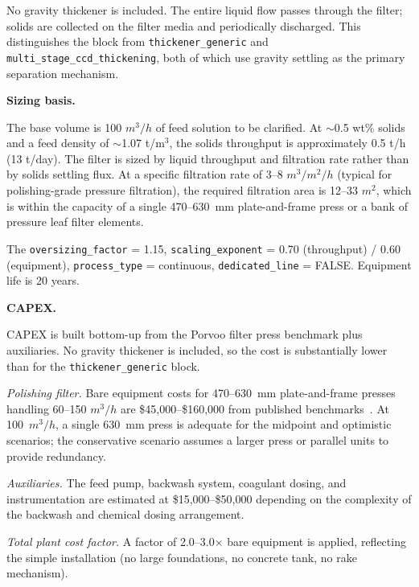 \noindent No gravity thickener is included. The entire liquid flow passes through the filter; solids are collected on the filter media and periodically discharged. This distinguishes the block from \texttt{thickener\_generic} and \texttt{multi\_stage\_ccd\_thickening}, both of which use gravity settling as the primary separation mechanism.


\medskip
\noindent\textbf{Sizing basis.}\quad

The base volume is 100 $\si{m^3/h}$ of feed solution to be clarified. At $\sim$0.5 wt\% solids and a feed density of $\sim$1.07 t/m$^3$, the solids throughput is approximately 0.5 t/h (13 t/day). The filter is sized by liquid throughput and filtration rate rather than by solids settling flux. At a specific filtration rate of 3--8 $\si{m^3/m^2/h}$ (typical for polishing-grade pressure filtration), the required filtration area is 12--33 $\si{m^2}$, which is within the capacity of a single 470--630~mm plate-and-frame press or a bank of pressure leaf filter elements.

The \texttt{oversizing\_factor} = 1.15, \texttt{scaling\_exponent} = 0.70 (throughput) / 0.60 (equipment), \texttt{process\_type} = continuous, \texttt{dedicated\_line} = FALSE. Equipment life is 20 years.

\medskip
\noindent\textbf{CAPEX.}\quad

CAPEX is built bottom-up from the Porvoo filter press benchmark plus auxiliaries. No gravity thickener is included, so the cost is substantially lower than for the \texttt{thickener\_generic} block.

\textit{Polishing filter.} Bare equipment costs for 470--630~mm plate-and-frame presses handling 60--150 $\si{m^3/h}$ are \$45,000--\$160,000 from published benchmarks~\citep{porvooIndustrialFilterPress2025}. At 100~$\si{m^3/h}$, a single 630~mm press is adequate for the midpoint and optimistic scenarios; the conservative scenario assumes a larger press or parallel units to provide redundancy.

\textit{Auxiliaries.} The feed pump, backwash system, coagulant dosing, and instrumentation are estimated at \$15,000--\$50,000 depending on the complexity of the backwash and chemical dosing arrangement.

\textit{Total plant cost factor.} A factor of 2.0--3.0$\times$ bare equipment is applied, reflecting the simple installation (no large foundations, no concrete tank, no rake mechanism).

